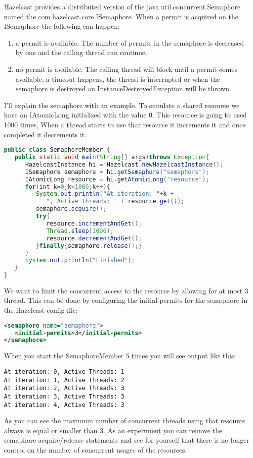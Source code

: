Hazelcast provides a distributed version of the java.util.concurrent.Semaphore named the com.hazelcast.core.ISemaphore. When a permit is acquired on the ISemaphore the following can happen:
\begin{enumerate}
\item a permit is available. The number of permits in the semaphore is decreased by one and the calling thread can continue. 
\item no permit is available. The calling thread will block until a permit comes available, a timeout happens, the thread is interrupted or when the semaphore is destroyed an InstanceDestroyedException will be thrown.
\end{enumerate}
I'll explain the semaphore with an example. To simulate a shared resource we have an IAtomicLong initialized with the value 0. This resource is going to used 1000 times, When a thread starts to use that resource it increments it and once completed it decrements it.
\begin{lstlisting}[language=java]
public class SemaphoreMember {
   public static void main(String[] args)throws Exception{
      HazelcastInstance hi = Hazelcast.newHazelcastInstance();
      ISemaphore semaphore = hi.getSemaphore("semaphore");
      IAtomicLong resource = hi.getAtomicLong("resource");
      for(int k=0;k<1000;k++){
         System.out.println("At iteration: "+k +
            ", Active Threads: " + resource.get());
         semaphore.acquire();
         try{
            resource.incrementAndGet();
            Thread.sleep(1000);
            resource.decrementAndGet();
         }finally{semaphore.release();}
      }
      System.out.println("Finished");
   }
}
\end{lstlisting}
We want to limit the concurrent access to the resource by allowing for at most 3 thread. This can be done by configuring the initial-permits for the semaphore in the Hazelcast config file:
\begin{lstlisting}[language=xml]
<semaphore name="semaphore">
   <initial-permits>3</initial-permits>
</semaphore>
\end{lstlisting}
When you start the SemaphoreMember 5 times you will see output like this:
\begin{lstlisting}
At iteration: 0, Active Threads: 1
At iteration: 1, Active Threads: 2
At iteration: 2, Active Threads: 3
At iteration: 3, Active Threads: 3
At iteration: 4, Active Threads: 3
\end{lstlisting}
As you can see the maximum number of concurrent threads using that resource always is equal or smaller than 3. As an experiment you can remove the semaphore acquire/release statements and see for yourself that there is no longer control on the number of concurrent usages of the resources.

